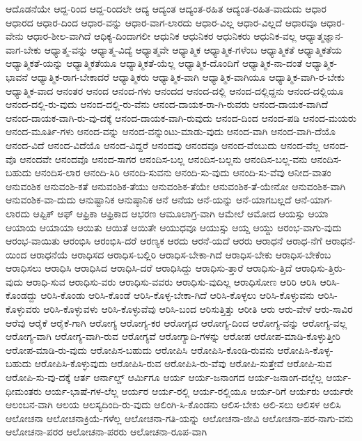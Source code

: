 {ಆದೊಡನೆಯೇ
ಆದ್ದ-ರಿಂದ
ಆದ್ದ-ರಿಂದಲೇ
ಆದ್ಯ
ಆದ್ಯಂತ
ಆದ್ಯಂತ-ರಹಿತ
ಆದ್ಯಂತ-ರಹಿತ-ವಾದುದು
ಆಧಾರ
ಆಧಾರದ
ಆಧಾರ-ದಿಂದ
ಆಧಾರ-ವನ್ನು
ಆಧಾರ-ವಾಗ-ಲಾರದು
ಆಧಾರ-ವಿಲ್ಲ
ಆಧಾರ-ವಿಲ್ಲದೆ
ಆಧಾರವೂ
ಆಧಾರ-ವೇನು
ಆಧಾರ-ಶೀಲ-ವಾಗಿದೆ
ಆಧಿಕ್ಯ-ದಿಂದಾಗಲೀ
ಆಧುನಿಕ
ಆಧುನಿಕರ
ಆಧುನಿಕರು
ಆಧುನಿಕ-ವಲ್ಲ
ಆಧ್ಯಾತ್ಮಜ್ಞಾನ-ವಾಗ-ಬೇಕು
ಆಧ್ಯಾತ್ಮ-ವನ್ನು
ಆಧ್ಯಾತ್ಮ-ವಿದ್ಯೆ
ಆಧ್ಯಾತ್ಮವೇ
ಆಧ್ಯಾತ್ಮಿಕ
ಆಧ್ಯಾತ್ಮಿಕ-ಗಳೆಂಬ
ಆಧ್ಯಾತ್ಮಿಕತೆ
ಆಧ್ಯಾತ್ಮಿಕತೆಯ
ಆಧ್ಯಾತ್ಮಿಕತೆ-ಯನ್ನು
ಆಧ್ಯಾತ್ಮಿಕತೆಯೂ
ಆಧ್ಯಾತ್ಮಿಕತೆ-ಯೆಲ್ಲ
ಆಧ್ಯಾತ್ಮಿಕ-ದೊಂದಿಗೆ
ಆಧ್ಯಾತ್ಮಿಕ-ನಾ-ದಂತೆ
ಆಧ್ಯಾತ್ಮಿಕ-ಭಾವನೆ
ಆಧ್ಯಾತ್ಮಿಕ-ರಾಗ-ಬೇಕಾದರೆ
ಆಧ್ಯಾತ್ಮಿಕರು
ಆಧ್ಯಾತ್ಮಿಕ-ವಾಗಿ
ಆಧ್ಯಾತ್ಮಿಕ-ವಾಗಿಯೂ
ಆಧ್ಯಾತ್ಮಿಕ-ವಾಗಿ-ರ-ಬೇಕು
ಆಧ್ಯಾತ್ಮಿಕ-ವಾದ
ಆನಂತರ
ಆನಂದ
ಆನಂದ-ಗಳು
ಆನಂದದ
ಆನಂದ-ದಲ್ಲಿ
ಆನಂದ-ದಲ್ಲಿದ್ದನು
ಆನಂದ-ದಲ್ಲಿಯೂ
ಆನಂದ-ದಲ್ಲಿ-ರು-ವುದು
ಆನಂದ-ದಲ್ಲಿ-ರು-ವೆನು
ಆನಂದ-ದಾಯಕ-ರಾ-ಗಿ-ರುವರು
ಆನಂದ-ದಾಯಕ-ವಾಗಿದೆ
ಆನಂದ-ದಾಯಕ-ವಾಗಿ-ರು-ವು-ದಕ್ಕೆ
ಆನಂದ-ದಾಯಕ-ವಾಗಿ-ರುವುದು
ಆನಂದ-ದಿಂದ
ಆನಂದ-ಪಡಿ
ಆನಂದ-ಮಯರು
ಆನಂದ-ಮೂರ್ತಿ-ಗಳು
ಆನಂದ-ವನ್ನು
ಆನಂದ-ವನ್ನುಂಟು-ಮಾಡು-ವುದು
ಆನಂದ-ವಾಗಿ
ಆನಂದ-ವಾಗಿ-ದೆಯೊ
ಆನಂದ-ವಿದೆ
ಆನಂದ-ವಿದೆಯೊ
ಆನಂದ-ವಿದ್ದರೆ
ಆನಂದವು
ಆನಂದವೂ
ಆನಂದ-ವೆಂಬುದು
ಆನಂದ-ವೆಲ್ಲ
ಆನಂದ-ವೊ
ಆನಂದವೇ
ಆನಂದವೊ
ಆನಂದ-ಸಾಗರ
ಆನಂದಿಸ-ಬಲ್ಲ
ಆನಂದಿಸ-ಬಲ್ಲನು
ಆನಂದಿಸ-ಬಲ್ಲ-ವನು
ಆನಂದಿಸ-ಬಹುದು
ಆನಂದಿಸ-ಲಾರ
ಆನಂದಿ-ಸಿರಿ
ಆನಂದಿ-ಸುವನು
ಆನಂದಿ-ಸು-ವುದು
ಆನಂದಿ-ಸು-ವೆವು
ಆನೀದ-ವಾತಂ
ಆನುವಂಶಿಕ
ಆನುವಂಶಿ-ಕತೆ
ಆನುವಂಶಿಕ-ತೆಯು
ಆನುವಂಶಿಕ-ತೆಯೇ
ಆನುವಂಶಿಕ-ತೆ-ಯೇನೋ
ಆನುವಂಶಿಕ-ವಾಗಿ
ಆನುವಂಶಿಕ-ವಾ-ದುದು
ಆನುಷ್ಟಾನಿಕ
ಆನುಷ್ಠಾನಿಕ
ಆನೆ
ಆನೆಯ
ಆನೆ-ಯನ್ನು
ಆನೆ-ಯಾಗಬಲ್ಲದೆ
ಆನೆ-ಯಾಗ-ಲಾರದು
ಆಪ್ಟಿಕ್
ಆಫ್
ಆಫ್ರಿಕಾ
ಆಫ್ರಿಕಾದ
ಆಭರಣ
ಆಮೂಲಾಗ್ರ-ವಾಗಿ
ಆಮೇಲೆ
ಆಮೋದ
ಆಯಸ್ಸು
ಆಯಾ
ಆಯಾಯ
ಆಯಾಯಾ
ಆಯಿತು
ಆಯಿತೆ
ಆಯಿತೇ
ಆಯುಧವೂ
ಆಯುಸ್ಸು
ಆಯ್ದ
ಆಯ್ದು
ಆರಂಭ-ವಾಗು-ವುದು
ಆರಂಭ-ವಾಯಿತು
ಆರಂಭಿಸಿ
ಆರಂಭಿಸಿ-ದರೆ
ಆರಣ್ಯಕ
ಆರದು
ಆರನೆ-ಯದೆ
ಆರರು
ಆರಾಧನೆ
ಆರಾಧ-ನೆಗೆ
ಆರಾಧನೆ-ಯಿಂದ
ಆರಾಧನೆಯೆ
ಆರಾಧಿಸದ
ಆರಾಧಿಸ-ಬಲ್ಲಿರಿ
ಆರಾಧಿಸ-ಬೇಕಾ-ಗಿದೆ
ಆರಾಧಿಸ-ಬೇಕು
ಆರಾಧಿಸ-ಬೇಕೆಂಬ
ಆರಾಧಿಸಲು
ಆರಾಧಿಸಿ
ಆರಾಧಿಸಿದ
ಆರಾಧಿಸಿ-ದರೆ
ಆರಾಧಿಸಿದ್ದು
ಆರಾಧಿಸು-ತ್ತಾರೆ
ಆರಾಧಿಸು-ತ್ತಿದೆ
ಆರಾಧಿಸು-ತ್ತಿರು-ವುದು
ಆರಾಧಿ-ಸುವ
ಆರಾಧಿಸು-ವರು
ಆರಾಧಿಸು-ವವರು
ಆರಾಧಿಸು-ವುದಿಲ್ಲ
ಆರಾಧಿಸೋಣ
ಆರಿರಿ
ಆರಿಸಿ
ಆರಿಸಿ-ಕೊಂಡದ್ದು
ಆರಿಸಿ-ಕೊಂಡು
ಆರಿಸಿ-ಕೊಂಡೆ
ಆರಿಸಿ-ಕೊಳ್ಳ-ಬೇಕಾ-ಗಿದೆ
ಆರಿಸಿ-ಕೊಳ್ಳಲು
ಆರಿಸಿ-ಕೊಳ್ಳುವನು
ಆರಿಸಿ-ಕೊಳ್ಳುವರು
ಆರಿಸಿ-ಕೊಳ್ಳುವಳು
ಆರಿಸಿ-ಕೊಳ್ಳುವೆವು
ಆರಿಸಿ-ಬಂದ
ಆರಿಸುತ್ತಿತ್ತು
ಆರೀತಿ
ಆರು
ಆರು-ವೇಳೆ
ಆರು-ಸಾವಿರ
ಆರೆವು
ಆರೈಕೆ
ಆರೈಕೆ-ಗಾಗಿ
ಆರೋಗ್ಯ
ಆರೋಗ್ಯ-ಕರ
ಆರೋಗ್ಯದ
ಆರೋಗ್ಯ-ದಿಂದ
ಆರೋಗ್ಯ-ವನ್ನು
ಆರೋಗ್ಯ-ವಲ್ಲ
ಆರೋಗ್ಯ-ವಾಗಿ
ಆರೋಗ್ಯ-ವಾಗಿ-ರುವ
ಆರೋಗ್ಯವೆ
ಆರೋಗ್ಯಾದಿ-ಗಳನ್ನು
ಆರೋಪ
ಆರೋಪ-ಮಾಡಿ-ಕೊಳ್ಳುತ್ತೀರಿ
ಆರೋಪ-ಮಾಡಿ-ರು-ವುದು
ಆರೋಪಿಸ-ಬಹುದು
ಆರೋಪಿಸಿ
ಆರೋಪಿಸಿ-ಕೊಂಡಿ-ರುವನು
ಆರೋಪಿಸಿ-ಕೊಳ್ಳ-ಬಹುದು
ಆರೋಪಿಸಿ-ಕೊಳ್ಳುವುದು
ಆರೋಪಿಸಿ-ರುವ
ಆರೋಪಿಸಿ-ರು-ವೆವು
ಆರೋಪಿ-ಸುತ್ತೇವೆ
ಆರೋಪಿ-ಸುವ
ಆರೋಪಿ-ಸು-ವು-ದಕ್ಕೆ
ಆರ್ತ
ಆರ್ನಾಲ್ಡ್
ಆರ್ಮಿಗೂ
ಆರ್ಯ
ಆರ್ಯ-ಜನಾಂಗದ
ಆರ್ಯ-ಜನಾಂಗ-ದಲ್ಲೆಲ್ಲ
ಆರ್ಯ-ಧೀಮಂತರು
ಆರ್ಯ-ಭಾಷೆ-ಗಳ-ಲೆಲ್ಲ
ಆರ್ಯರ
ಆರ್ಯ-ರಲ್ಲಿ
ಆರ್ಯ-ರಲ್ಲಿಯೂ
ಆರ್ಯ-ರಿಗೆ
ಆರ್ಯರು
ಆರ್ಯರೇ
ಆಲಂಬನ-ವಾಗಿ
ಆಲಯ
ಆಲಸ್ಯದಿಂದಿ-ರು-ವುದು
ಆಲಿಂಗಿ-ಸಿ-ಕೊಂಡನು
ಆಲಿಸ-ಬೇಕು
ಆಲಿ-ಸಲು
ಆಲಿಸಳ
ಆಲಿಸಿ
ಆಲೋಚನಾ
ಆಲೋಚನಾಕ್ರಿಯೆ-ಗಳೆಲ್ಲ
ಆಲೋಚನಾ-ಗತಿ-ಯನ್ನು
ಆಲೋಚನಾ-ಜೀವಿ
ಆಲೋಚನಾ-ಪರ-ನಾಗು-ವನು
ಆಲೋಚನಾ-ಪರರ
ಆಲೋಚನಾ-ಪರರು
ಆಲೋಚನಾ-ರೂಪ-ವಾಗಿ
}
